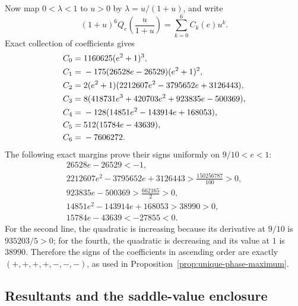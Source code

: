 \documentclass[11pt,reqno,letterpaper]{amsart}
\numberwithin{equation}{section}
\theoremstyle{definition}
\theoremstyle{remark}
\begin{document}
Now map \(0<\lambda<1\) to \(u>0\) by
\(\lambda=u/(1+u)\), and write
\begin{equation}\label{eq:Descartes-transform}
 (1+u)^6Q_e\left(\frac{u}{1+u}\right)
 =\sum_{k=0}^6C_k(e)u^k.
\end{equation}
Exact collection of coefficients gives
\begin{align}
 C_0={}&1160625(e^2+1)^3,\notag\\
 C_1={}&-175(26528e-26529)(e^2+1)^2,\notag\\
 C_2={}&2(e^2+1)(2212607e^2-3795652e+3126443),\notag\\
 C_3={}&8(418731e^3+420703e^2+923835e-500369),\notag\\
 C_4={}&-128(14851e^2-143914e+168053),\notag\\
 C_5={}&512(15784e-43639),\notag\\
 C_6={}&-7606272.\label{eq:Descartes-coefficients}
\end{align}
The following exact margins prove their signs uniformly on
\(9/10<e<1\):
\begin{gather*}
 26528e-26529<-1,\\
 2212607e^2-3795652e+3126443
 >\frac{150256787}{100}>0,\\
 923835e-500369>\frac{662165}{2}>0,\\
 14851e^2-143914e+168053>38990>0,\\
 15784e-43639<-27855<0.
\end{gather*}
For the second line, the quadratic is increasing because its derivative
at \(9/10\) is \(935203/5>0\); for the fourth, the quadratic is
decreasing and its value at \(1\) is \(38990\).  Therefore the signs of
the coefficients in ascending order are exactly
\((+,+,+,+,-,-,-)\), as used in
Proposition~\ref{prop:unique-phase-maximum}.

\subsection{Resultants and the saddle-value enclosure}
\label{subsec:saddle-value-enclosure}
\end{document}
